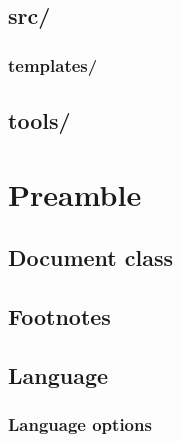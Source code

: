     \subsection{src/}
    \label{sec:tutorial/architecture/src}
    
    
        \subsubsection{templates/}
        \label{sec:tutorial/architecture/src/template}
        
    
    \subsection{tools/}
    \label{sec:tutorial/architecture/tools}
    
    
\newpage
\section{Preamble}
\label{sec:tutorial/preamble}


    \subsection*{\thesubsection\hspace{1em}Document \gls{class}}
    \label{sec:tutorial/preamble/doc}
    
    
    \subsection{Footnotes}
    \label{sec:tutorial/preamble/footnote}
    
    
    \subsection{Language}
    \label{sec:tutorial/preamble/language}
    
    
        \subsubsection{Language options}
        \label{sec:tutorial/preamble/language/options}
        
    
